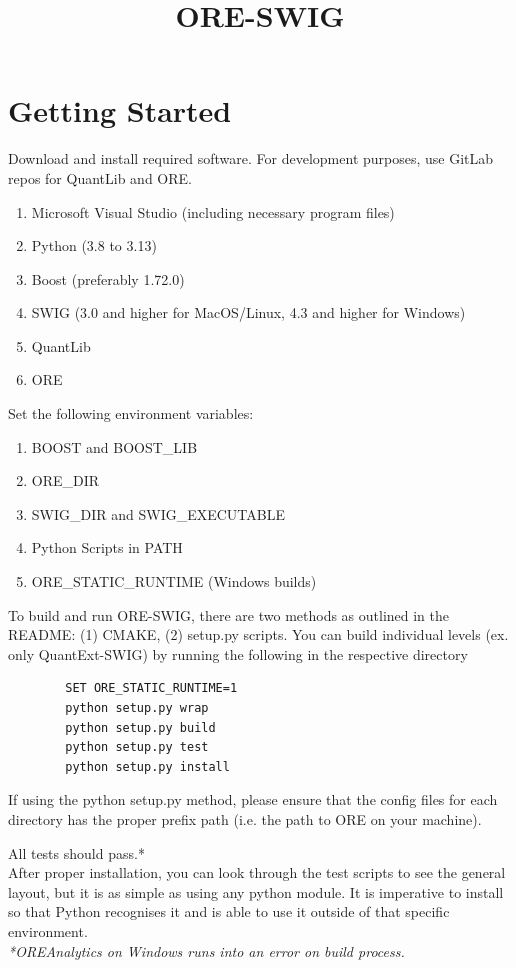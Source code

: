 \documentclass[10pt]{article}
\title{ORE-SWIG}
\date{}
\begin{document}
\maketitle
\section*{Getting Started}
    Download and install required software. For development purposes, use GitLab repos for QuantLib and ORE.
\begin{enumerate}
    \item Microsoft Visual Studio (including necessary program files)
    \item Python (3.8 to 3.13)
    \item Boost (preferably 1.72.0)
    \item SWIG (3.0 and higher for MacOS/Linux, 4.3 and higher for Windows)
    \item QuantLib
    \item ORE
\end{enumerate}

Set the following environment variables:
\begin{enumerate}
    \item BOOST and BOOST\_LIB
    \item ORE\_DIR
    \item SWIG\_DIR and SWIG\_EXECUTABLE
    \item Python Scripts in PATH
    \item ORE\_STATIC\_RUNTIME (Windows builds)
\end{enumerate}

To build and run ORE-SWIG, there are two methods as outlined in the README: (1) CMAKE, (2) setup.py scripts. You can build individual levels (ex. only QuantExt-SWIG) by running the following in the respective directory
\begin{lstlisting}
        SET ORE_STATIC_RUNTIME=1
        python setup.py wrap
        python setup.py build
        python setup.py test
        python setup.py install
\end{lstlisting}

If using the python setup.py method, please ensure that the config files for each directory has the proper prefix path (i.e. the path to ORE on your machine).

All tests should pass.* \\
After proper installation, you can look through the test scripts to see the general layout, but it is as simple as using any python module. It is imperative to install so that Python recognises it and is able to use it outside of that specific environment.\\
\textit{*OREAnalytics on Windows runs into an error on build process.}
\end{document}
